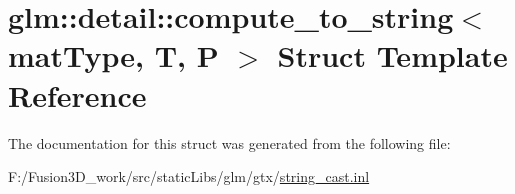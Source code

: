 \hypertarget{structglm_1_1detail_1_1compute__to__string}{}\section{glm\+:\+:detail\+:\+:compute\+\_\+to\+\_\+string$<$ mat\+Type, T, P $>$ Struct Template Reference}
\label{structglm_1_1detail_1_1compute__to__string}


The documentation for this struct was generated from the following file\+:\begin{DoxyCompactItemize}
\item 
F\+:/\+Fusion3\+D\+\_\+work/src/static\+Libs/glm/gtx/\hyperlink{string__cast_8inl}{string\+\_\+cast.\+inl}\end{DoxyCompactItemize}
